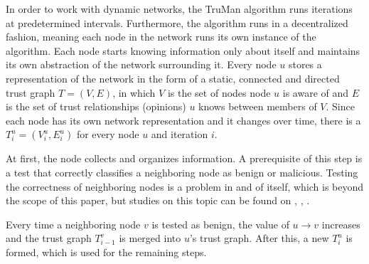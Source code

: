 \documentclass[conference]{IEEEtran}
\begin{document}

In order to work with dynamic networks, the TruMan algorithm runs iterations at predetermined intervals.
Furthermore, the algorithm runs in a decentralized fashion, meaning each node in the network runs its own instance of the algorithm.
Each node starts knowing information only about itself and maintains its own abstraction of the network surrounding it.
Every node $u$ stores a representation of the network in the form of a static, connected and directed trust graph $T = (V, E)$, in which $V$ is the set of nodes node $u$ is aware of and $E$ is the set of trust relationships (opinions) $u$ knows between members of $V$.
Since each node has its own network representation and it changes over time, there is a $T^u_i = (V^u_i, E^u_i)$ for every node $u$ and iteration $i$.



At first, the node collects and organizes information.
A prerequisite of this step is a test that correctly classifies a neighboring node as benign or malicious.
Testing the correctness of neighboring nodes is a problem in and of itself, which is beyond the scope of this paper, but studies on this topic can be found on \cite{golle2004detecting}, \cite{kerrache2016detection}, \cite{li2016defective}.


Every time a neighboring node $v$ is tested as benign, the value of $u \rightarrow v$ increases and the trust graph $T^v_{i-1}$ is merged into $u$'s trust graph.
After this, a new $T^u_i$ is formed, which is used for the remaining steps.
\end{document}
